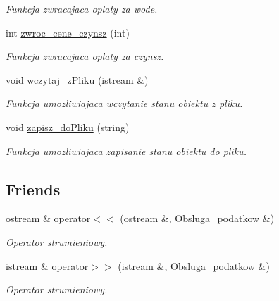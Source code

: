 \begin{DoxyCompactItemize}
\begin{DoxyCompactList}\small\item\em Funkcja zwracajaca oplaty za wode. \end{DoxyCompactList}\item 
int \hyperlink{class_obsluga__podatkow_a322f0e50968dfd1bfdc2e2ee84672c26}{zwroc\+\_\+cene\+\_\+czynsz} (int)
\begin{DoxyCompactList}\small\item\em Funkcja zwracajaca oplaty za czynsz. \end{DoxyCompactList}\item 
\hypertarget{class_obsluga__podatkow_a8b4b1381191748664b9196f11429eb8c}{}void \hyperlink{class_obsluga__podatkow_a8b4b1381191748664b9196f11429eb8c}{wczytaj\+\_\+z\+Pliku} (istream \&)\label{class_obsluga__podatkow_a8b4b1381191748664b9196f11429eb8c}

\begin{DoxyCompactList}\small\item\em Funkcja umozliwiajaca wczytanie stanu obiektu z pliku. \end{DoxyCompactList}\item 
\hypertarget{class_obsluga__podatkow_a585a36ed435b2a623d0d76911ce7a5c6}{}void \hyperlink{class_obsluga__podatkow_a585a36ed435b2a623d0d76911ce7a5c6}{zapisz\+\_\+do\+Pliku} (string)\label{class_obsluga__podatkow_a585a36ed435b2a623d0d76911ce7a5c6}

\begin{DoxyCompactList}\small\item\em Funkcja umozliwiajaca zapisanie stanu obiektu do pliku. \end{DoxyCompactList}\end{DoxyCompactItemize}
\subsection*{Friends}
\begin{DoxyCompactItemize}
\item 
\hypertarget{class_obsluga__podatkow_a4fc169c719017008b6bcd0527622d787}{}ostream \& \hyperlink{class_obsluga__podatkow_a4fc169c719017008b6bcd0527622d787}{operator$<$$<$} (ostream \&, \hyperlink{class_obsluga__podatkow}{Obsluga\+\_\+podatkow} \&)\label{class_obsluga__podatkow_a4fc169c719017008b6bcd0527622d787}

\begin{DoxyCompactList}\small\item\em Operator strumieniowy. \end{DoxyCompactList}\item 
\hypertarget{class_obsluga__podatkow_a4c641271170d7967f22217bc47fc8c54}{}istream \& \hyperlink{class_obsluga__podatkow_a4c641271170d7967f22217bc47fc8c54}{operator$>$$>$} (istream \&, \hyperlink{class_obsluga__podatkow}{Obsluga\+\_\+podatkow} \&)\label{class_obsluga__podatkow_a4c641271170d7967f22217bc47fc8c54}

\begin{DoxyCompactList}\small\item\em Operator strumieniowy. \end{DoxyCompactList}\end{DoxyCompactItemize}


